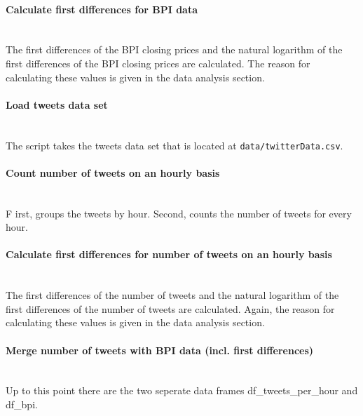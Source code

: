 \documentclass[a4paper,12pt]{article}
\begin{document}
\begin{spacing}{1.2}
\paragraph{Calculate first differences for BPI data}\mbox{}\\
The first differences of the BPI closing prices and the natural logarithm of the first differences of the BPI closing prices are calculated. The reason for calculating these values is given in the data analysis section.

\paragraph{Load tweets data set}\mbox{}\\ 
The script takes the tweets data set that is located at \verb|data/twitterData.csv|.

\paragraph{Count number of tweets on an hourly basis}\mbox{}\\ F
irst, groups the tweets by hour. Second, counts the number of tweets for every hour.

\paragraph{Calculate first differences for number of tweets on an hourly basis}\mbox{}\\ 
The first differences of the number of tweets and the natural logarithm of the first differences of the number of tweets are calculated. Again, the reason for calculating these values is given in the data analysis section.

\paragraph{Merge number of tweets with BPI data (incl. first differences)}\mbox{}\\
Up to this point there are the two seperate data frames df\_tweets\_per\_hour and df\_bpi.


\end{spacing}
\end{document}
